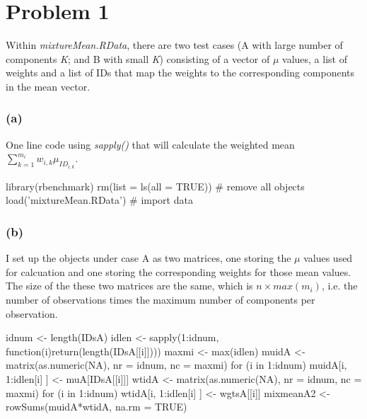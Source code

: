 \documentclass{article}
\begin{document}
\section*{Problem 1}

Within \textit{mixtureMean.RData}, there are two test cases (A with large number of components \textit{K}; 
and B with small \textit{K}) consisting of a vector of $\mu$ values, a list of weights and a list of IDs that
map the weights to the corresponding components in the mean vector.

\subsubsection*{(a)}
One line code using \textit{sapply()} that will calculate the weighted mean $\sum_{k=1}^{m_i} w_{i,k}\mu_{ID_{i,k}}$.

library(rbenchmark)
rm(list = ls(all = TRUE)) # remove all objects
load('mixtureMean.RData') # import data


\subsubsection*{(b)}
I set up the objects under case A as two matrices, one storing the $\mu$ values used for calcuation and one
storing the corresponding weights for those mean values. The size of the these two matrices are the same,
which is $n \times max(m_i)$, i.e. the number of observations times the maximum number of components per observation.

idnum <- length(IDsA)
idlen <- sapply(1:idnum, function(i){return(length(IDsA[[i]]))})
maxmi <- max(idlen)
muidA <- matrix(as.numeric(NA), nr = idnum, nc = maxmi)
for (i in 1:idnum) {
	muidA[i, 1:idlen[i] ] <- muA[IDsA[[i]]]
}
wtidA <- matrix(as.numeric(NA), nr = idnum, nc = maxmi)
for (i in 1:idnum) {
	wtidA[i, 1:idlen[i] ] <- wgtsA[[i]]
}
mixmeanA2 <- rowSums(muidA*wtidA, na.rm = TRUE)
\end{document}

